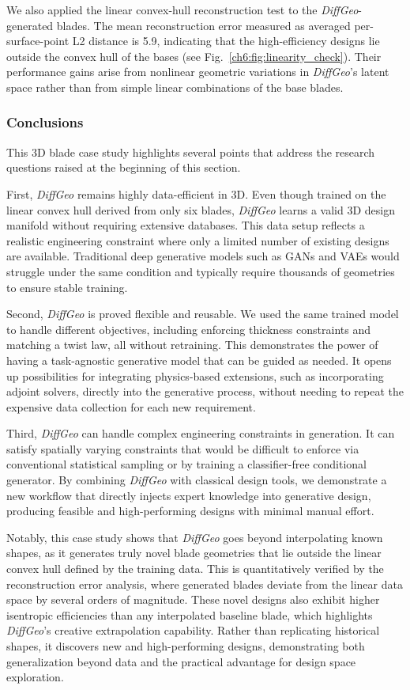 We also applied the linear convex-hull reconstruction test to the \textit{DiffGeo}-generated blades. The mean reconstruction error measured as averaged per-surface-point L2 distance is 5.9, indicating that the high-efficiency designs lie outside the convex hull of the bases (see Fig.~\ref{ch6:fig:linearity_check}). Their performance gains arise from nonlinear geometric variations in \textit{DiffGeo}’s latent space rather than from simple linear combinations of the base blades.

\subsubsection{Conclusions}
This 3D blade case study highlights several points that address the research questions raised at the beginning of this section.

First, \textit{DiffGeo} remains highly data-efficient in 3D. Even though trained on the linear convex hull derived from only six blades, \textit{DiffGeo} learns a valid 3D design manifold without requiring extensive databases. This data setup reflects a realistic engineering constraint where only a limited number of existing designs are available. Traditional deep generative models such as GANs and VAEs would struggle under the same condition and typically require thousands of geometries to ensure stable training.

Second, \textit{DiffGeo} is proved flexible and reusable. We used the same trained model to handle different objectives, including enforcing thickness constraints and matching a twist law, all without retraining. This demonstrates the power of having a task-agnostic generative model that can be guided as needed. It opens up possibilities for integrating physics-based extensions, such as incorporating adjoint solvers, directly into the generative process, without needing to repeat the expensive data collection for each new requirement.

Third, \textit{DiffGeo} can handle complex engineering constraints in generation. It can satisfy spatially varying constraints that would be difficult to enforce via conventional statistical sampling or by training a classifier-free conditional generator. By combining \textit{DiffGeo} with classical design tools, we demonstrate a new workflow that directly injects expert knowledge into generative design, producing feasible and high-performing designs with minimal manual effort. 

Notably, this case study shows that \textit{DiffGeo} goes beyond interpolating known shapes, as it generates truly novel blade geometries that lie outside the linear convex hull defined by the training data. This is quantitatively verified by the reconstruction error analysis, where generated blades deviate from the linear data space by several orders of magnitude. These novel designs also exhibit higher isentropic efficiencies than any interpolated baseline blade, which highlights \textit{DiffGeo}’s creative extrapolation capability. Rather than replicating historical shapes, it discovers new and high-performing designs, demonstrating both generalization beyond data and the practical advantage for design space exploration.